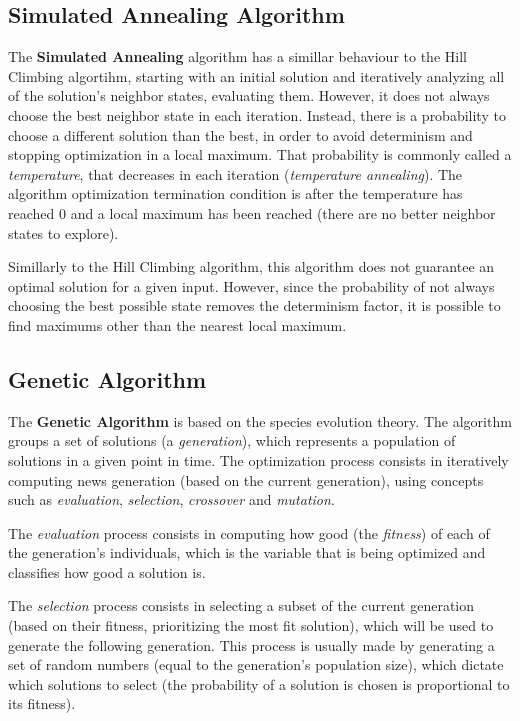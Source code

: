 \documentclass[conference]{IEEEtran}
\begin{document}
\subsection{Simulated Annealing Algorithm}

The \textbf{Simulated Annealing} algorithm has a simillar behaviour to the Hill Climbing algortihm, starting with an initial solution and iteratively analyzing all of the solution's neighbor states, evaluating them. However, it does not always choose the best neighbor state in each iteration. Instead, there is a probability to choose a different solution than the best, in order to avoid determinism and stopping optimization in a local maximum. That probability is commonly called a \textit{temperature}, that decreases in each iteration (\textit{temperature annealing}). The algorithm optimization termination condition is after the temperature has reached 0 and a local maximum has been reached (there are no better neighbor states to explore).

Simillarly to the Hill Climbing algorithm, this algorithm does not guarantee an optimal solution for a given input. However, since the probability of not always choosing the best possible state removes the determinism factor, it is possible to find maximums other than the nearest local maximum.

\subsection{Genetic Algorithm}

The \textbf{Genetic Algorithm} is based on the species evolution theory. The algorithm groups a set of solutions (a \textit{generation}), which represents a population of solutions in a given point in time. The optimization process consists in iteratively computing news generation (based on the current generation), using concepts such as \textit{evaluation}, \textit{selection}, \textit{crossover} and \textit{mutation}. 

The \textit{evaluation} process consists in computing how good (the \textit{fitness}) of each of the generation's individuals, which is the variable that is being optimized and classifies how good a solution is.

The \textit{selection} process consists in selecting a subset of the current generation (based on their fitness, prioritizing the most fit solution), which will be used to generate the following generation. This process is usually made by generating a set of random numbers (equal to the generation's population size), which dictate which solutions to select (the probability of a solution is chosen is proportional to its fitness).
\end{document}
